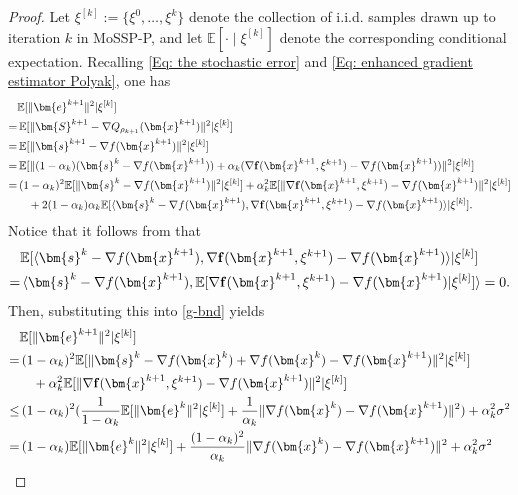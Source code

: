 \documentclass{article}
\theoremstyle{plain}
\theoremstyle{definition}
\theoremstyle{remark}
\newcommand{\EE}{\mathbb{E}}
\newcommand{\bx}{\bm{x}}
\newcommand{\be}{\bm{e}}
\newcommand{\bS}{\bm{S}}
\newcommand{\bs}{\bm{s}}
\newcommand{\tf}{\mathbf{f}}
\numberwithin{equation}{section}
\begin{document}
\begin{proof}
Let $\xi^{[k]} := \{\xi^0,\ldots,\xi^k\}$ denote the collection of i.i.d. samples drawn up to iteration $k$ in MoSSP-P, and let $\EE[\cdot \mid \xi^{[k]}]$ denote the corresponding conditional expectation.
Recalling \eqref{Eq: the stochastic error} and \eqref{Eq: enhanced gradient estimator Polyak}, one has
\begin{align}
&\EE[\|\be^{k+1}\|^2|\xi^{[k]}] \notag \\
=&\, \EE[\|\bS^{k+1}- \nabla Q_{\rho_{k+1}}(\bx^{k+1})\|^2|\xi^{[k]}] \notag\\
=&\, \EE[\|\bs^{k+1} - \nabla f(\bx^{k+1})\|^2|\xi^{[k]}] \notag \\
=&\, \EE[\|(1-\alpha_k)(\bs^k - \nabla f(\bx^{k+1})) + \alpha_k(\nabla \tf(\bx^{k+1},\xi^{k+1}) - \nabla f(\bx^{k+1}))\|^2 |\xi^{[k]}] \notag \\
=&\, (1-\alpha_k)^2 \EE[\|\bs^k - \nabla f(\bx^{k+1})\|^2|\xi^{[k]}]  + \alpha_k^2 \EE[\|\nabla \tf(\bx^{k+1},\xi^{k+1})-\nabla f(\bx^{k+1})\|^2|\xi^{[k]}] \notag \\
&\quad + 2(1-\alpha_k)\alpha_k \EE[\langle \bs^k - \nabla f(\bx^{k+1}),\nabla \tf(\bx^{k+1},\xi^{k+1})-\nabla f(\bx^{k+1})\rangle|\xi^{[k]}].  \label{g-bnd}
\end{align}
Notice that it follows from  that
\begin{align}
&\EE[\langle\bs^k - \nabla f(\bx^{k+1}), \nabla \tf(\bx^{k+1},\xi^{k+1})-\nabla f(\bx^{k+1})\rangle|\xi^{[k]}]\notag \\
=&\,\langle\bs^k - \nabla f(\bx^{k+1}),  \EE[\nabla \tf(\bx^{k+1},\xi^{k+1})-\nabla f(\bx^{k+1})|\xi^{[k]}] \rangle
=0.
\end{align}
Then, substituting this into \eqref{g-bnd} yields
\begin{align}
&\EE[\|\be^{k+1}\|^2|\xi^{[k]}] \notag \\
=&\,  (1-\alpha_k)^2\EE[\|\bs^k - \nabla f(\bx^{k}) +  \nabla f(\bx^{k}) - \nabla f(\bx^{k+1})\|^2|\xi^{[k]}] \notag \\
&\quad + \alpha_k^2 \EE[\|\nabla \tf(\bx^{k+1},\xi^{k+1}) - \nabla f(\bx^{k+1})\|^2 |\xi^{[k]}] \notag \\
\leq&\, (1-\alpha_k)^2 ( \frac{1}{1-\alpha_k}\EE[\|\be^k\|^2 |\xi^{[k]}] +  \frac{1}{\alpha_k}\|\nabla f(\bx^{k}) - \nabla f(\bx^{k+1})\|^2) + \alpha_k^2 \sigma^2 \notag \\
=&\, (1-\alpha_k)\EE[\|\be^k\|^2|\xi^{[k]}] + \frac{(1-\alpha_k)^2}{\alpha_k}\|\nabla f(\bx^{k}) - \nabla f(\bx^{k+1})\|^2 + \alpha_k^2 \sigma^2 \notag \\

\end{align}
\end{proof}
\end{document}
